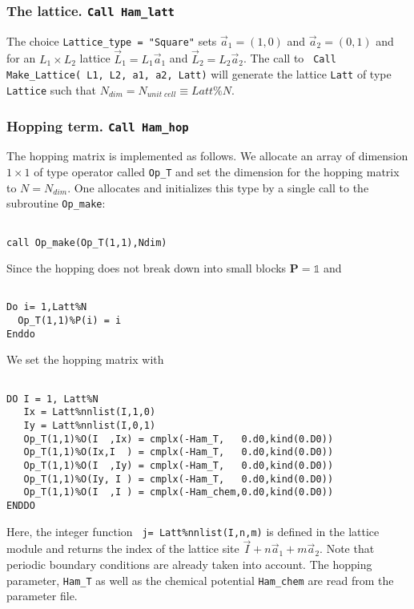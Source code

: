 \subsubsection{The lattice.   \texttt{Call Ham\_latt} }
The choice \texttt{Lattice\_type = "Square"} sets $\vec{a}_1 =  (1,0) $ and $\vec{a}_2 =  (0,1) $  and for an $L_1 \times L_2$  lattice  $\vec{L}_1 = L_1 \vec{a}_1$ and  $\vec{L}_2 = L_2 \vec{a}_2$.     The call to  \texttt{ Call Make\_Lattice( L1, L2, a1,  a2, Latt)} will generate the lattice   \texttt{Latt} of type \texttt{Lattice} such that  $N_{dim}   =N_{unit\;cell} \equiv Latt\%N$. 


\subsubsection{Hopping term. \texttt{Call Ham\_hop}}
The hopping matrix is implemented as follows. 
We allocate an array of dimension $1\times 1$ of type operator  called \texttt{Op\_T} and set the  dimension for the hopping  matrix to $N=N_{dim}$. One  allocates and initializes this type by a single call to the subroutine \texttt{Op\_make}: 
\begin{lstlisting}

call Op_make(Op_T(1,1),Ndim)

\end{lstlisting}
Since the hopping  does not  break down into small blocks ${\bm P}=\mathds{1}$   and  
\begin{lstlisting}

Do i= 1,Latt%N
  Op_T(1,1)%P(i) = i
Enddo

\end{lstlisting}
We set the hopping matrix  with 
\begin{lstlisting}

DO I = 1, Latt%N
   Ix = Latt%nnlist(I,1,0)
   Iy = Latt%nnlist(I,0,1)
   Op_T(1,1)%O(I  ,Ix) = cmplx(-Ham_T,   0.d0,kind(0.D0))
   Op_T(1,1)%O(Ix,I  ) = cmplx(-Ham_T,   0.d0,kind(0.D0))
   Op_T(1,1)%O(I  ,Iy) = cmplx(-Ham_T,   0.d0,kind(0.D0))
   Op_T(1,1)%O(Iy, I ) = cmplx(-Ham_T,   0.d0,kind(0.D0))
   Op_T(1,1)%O(I  ,I ) = cmplx(-Ham_chem,0.d0,kind(0.D0))
ENDDO

\end{lstlisting}
Here,    the integer  function \texttt{  j=  Latt\%nnlist(I,n,m)}   is defined in the lattice module and returns the index of the lattice site $ \vec{I} +  n \vec{a}_1 +  m \vec{a}_2$. Note that periodic boundary conditions are 
already taken into account.  The hopping parameter, \texttt{Ham\_T} as well as the chemical potential \texttt{Ham\_chem} are read from the parameter file.  

